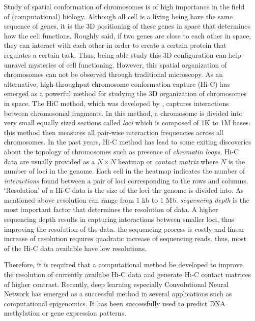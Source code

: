 \documentclass{article}
\begin{document}
Study of spatial conformation of chromosomes is
of high importance in the field of (computational)
biology. Although all cell is a living being
have the same sequence of genes, it is the 
3D positioning of these genes in space that
determines how the cell functions.
Roughly said,
if two genes are close to each other in
space, they can interact with each other
in order to create a certain protein that
regulates a certain task.
Thus, being
able study this 3D configuration can help
unravel mysteries of cell functioning.
However, this spatial organization of chromosomes
can not be observed through traditional 
microscopy. As an alternative,
high-throughput chromosome conformation capture
(Hi-C) has emerged as
a powerful method for studying the
3D organization of chromosomes in space.
The HiC method, which was developed by 
\cite{lieberman2009comprehensive}, 
captures interactions between
chromosomal fragments.
In this method, a chromosome is divided into
very small equally sized
sections called \textit{loci}
which is composed of 1K to 1M bases.
this method then
measures all pair-wise interaction frequencies 
across all chromosomes. 
In the past years, Hi-C method has lead to some
exiting discoveries about the topology of 
chromosomes such as presence of \textit{chromatin
loops}.
Hi-C data are usually provided as a $N \times N$
heatmap or \textit{contact matrix} where $N$ is 
the number of loci in the genome. Each cell in 
the heatmap indicates the number of \textit{interactions}
found between a pair of loci corresponding to the
rows and columns. `Resolution' of a Hi-C data
is the size of the loci the genome is
divided into.
As mentioned above
resolution can range from 1 kb to 1 Mb.
\textit{sequencing depth} is the most
important factor that determines the resolution
of data. A higher sequencing depth results in
capturing interactions between smaller loci,
thus improving the resolution of the data.
the sequencing process is costly and 
linear increase of resolution requires
quadratic increase of sequencing reads.
thus, most of the Hi-C data available have
low resolutions.

Therefore, it is required that a computational
method be developed to improve the resolution of
currently availabe Hi-C data and generate Hi-C
contact matrices of higher contrast.
Recently, deep learning 
especially Convolutional Neural Network
has emerged as a successful
method in several applications such as 
computational epigenomics. It has been
successfully used to predict DNA methylation
or gene expression patterns.
\end{document}
